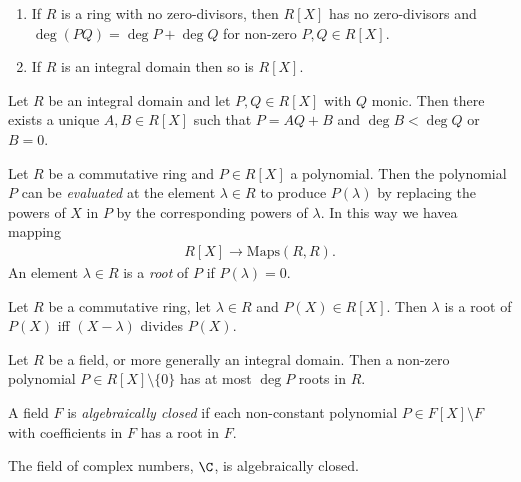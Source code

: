 \documentclass{article}
\begin{document}
\begin{lemma}
    \begin{enumerate}
        \item If $R$ is a ring with no zero-divisors, then $R[X]$ has no zero-divisors 
            and $\deg(PQ)=\deg P + \deg Q$ for non-zero $P,Q\in R[X]$.
        \item If $R$ is an integral domain then so is $R[X]$.
    \end{enumerate} 
\end{lemma}

\begin{theorem}[Notes 3.3.4]
    Let $R$ be an integral domain and let $P,Q\in R[X]$ with $Q$ monic. Then there exists 
    a unique $A,B\in R[X]$ such that $P=AQ+B$ and $\deg B<\deg Q$ or $B=0$. 
\end{theorem}

\begin{definition}
    Let $R$ be a commutative ring and $P\in R[X]$ a polynomial. Then the polynomial $P$
    can be \emph{evaluated} at the element $\lambda\in R$ to produce $P(\lambda)$
    by replacing the powers of $X$ in $P$ by the corresponding powers of $\lambda$. 
    In this way we havea mapping 
    \begin{align*}
        R[X] \to \text{Maps}(R,R).
    \end{align*}
    An element $\lambda\in R$ is a \emph{root} of $P$ if $P(\lambda) = 0$.
\end{definition}

\begin{proposition}[Notes 3.3.9]
    Let $R$ be a commutative ring, let $\lambda\in R$ and $P(X)\in R[X]$. Then $\lambda$
    is a root of $P(X)$ iff $(X-\lambda)$ divides $P(X)$. 
\end{proposition}

\begin{theorem}[Notes 3.3.10]
    Let $R$ be a field, or more generally an integral domain. Then a non-zero polynomial
    $P\in R[X]\setminus\{0\}$ has at most $\deg P$ roots in $R$. 
\end{theorem}

\begin{definition}
    A field $F$ is \emph{algebraically closed} if each non-constant polynomial $P\in F[X]\setminus F$
    with coefficients in $F$ has a root in $F$.
\end{definition}

\begin{theorem}
    The field of complex numbers, $\C$, is algebraically closed. 
\end{theorem}
\end{document}
